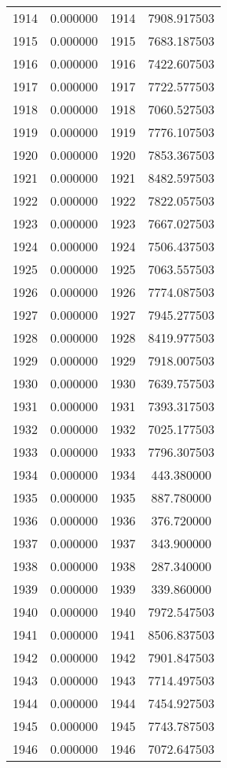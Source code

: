 \documentclass[12pt]{article}
\begin{document}
\begin{longtable}{@{}cccc@{}}
1914 & 0.000000 & 1914 & 7908.917503 \\
1915 & 0.000000 & 1915 & 7683.187503 \\
1916 & 0.000000 & 1916 & 7422.607503 \\
1917 & 0.000000 & 1917 & 7722.577503 \\
1918 & 0.000000 & 1918 & 7060.527503 \\
1919 & 0.000000 & 1919 & 7776.107503 \\
1920 & 0.000000 & 1920 & 7853.367503 \\
1921 & 0.000000 & 1921 & 8482.597503 \\
1922 & 0.000000 & 1922 & 7822.057503 \\
1923 & 0.000000 & 1923 & 7667.027503 \\
1924 & 0.000000 & 1924 & 7506.437503 \\
1925 & 0.000000 & 1925 & 7063.557503 \\
1926 & 0.000000 & 1926 & 7774.087503 \\
1927 & 0.000000 & 1927 & 7945.277503 \\
1928 & 0.000000 & 1928 & 8419.977503 \\
1929 & 0.000000 & 1929 & 7918.007503 \\
1930 & 0.000000 & 1930 & 7639.757503 \\
1931 & 0.000000 & 1931 & 7393.317503 \\
1932 & 0.000000 & 1932 & 7025.177503 \\
1933 & 0.000000 & 1933 & 7796.307503 \\
1934 & 0.000000 & 1934 & 443.380000 \\
1935 & 0.000000 & 1935 & 887.780000 \\
1936 & 0.000000 & 1936 & 376.720000 \\
1937 & 0.000000 & 1937 & 343.900000 \\
1938 & 0.000000 & 1938 & 287.340000 \\
1939 & 0.000000 & 1939 & 339.860000 \\
1940 & 0.000000 & 1940 & 7972.547503 \\
1941 & 0.000000 & 1941 & 8506.837503 \\
1942 & 0.000000 & 1942 & 7901.847503 \\
1943 & 0.000000 & 1943 & 7714.497503 \\
1944 & 0.000000 & 1944 & 7454.927503 \\
1945 & 0.000000 & 1945 & 7743.787503 \\
1946 & 0.000000 & 1946 & 7072.647503 \\

\end{longtable}
\end{document}

